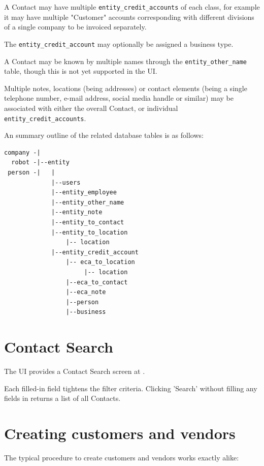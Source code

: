 A Contact may have multiple \texttt{entity\_credit\_accounts} of each class, for example it may have multiple "Customer" accounts corresponding with different divisions of a single company to be invoiced separately.

The \texttt{entity\_credit\_account} may optionally be assigned a business type.

A Contact may be known by multiple names through the \texttt{entity\_other\_name} table, though this is not yet supported in the UI.

Multiple notes, locations (being addresses) or contact elements (being a single telephone number, e-mail address, social media handle or similar) may be associated with either the overall Contact, or individual \texttt{entity\_credit\_accounts}.

An summary outline of the related database tables is as follows:
\begin{verbatim}
company -|
  robot -|--entity
 person -|   |
             |--users
             |--entity_employee
             |--entity_other_name
             |--entity_note
             |--entity_to_contact
             |--entity_to_location
                 |-- location
             |--entity_credit_account
                 |-- eca_to_location
                      |-- location
                 |--eca_to_contact
                 |--eca_note
                 |--person
                 |--business
\end{verbatim}

\section{Contact Search}
\label{sec-business-processes-customers-contact-search}

The \lsmb UI provides a Contact Search screen at . 

Each filled-in field tightens the filter criteria. Clicking 'Search' without filling any fields in returns a list of all Contacts.

\section{Creating customers and vendors}
\label{sec-business-processes-creating-customers-and-vendors}

The typical procedure to create customers and vendors works exactly alike:

